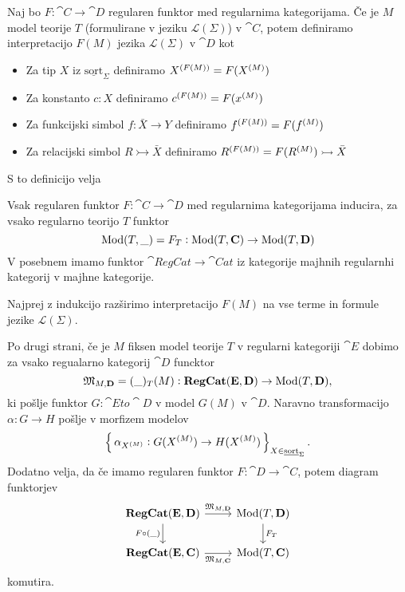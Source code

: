 \documentclass[../kategoricna_logika.tex]{subfiles}
\begin{document}
\begin{definicija}
  Naj bo $F : \cat{C} \to \cat{D}$ regularen funktor med regularnima kategorijama.
  Če je $M$ model teorije $T$ (formulirane v jeziku $\mathcal{L}(\Sigma)$) v $\cat{C}$,
  potem definiramo interpretacijo $F(M)$ jezika $\mathcal{L}(\Sigma)$ v $\cat{D}$ kot
  \begin{itemize}
    \item Za tip $X$ iz $\underline{\mathrm{sort}}_\Sigma$ definiramo $\interp[F(M)]{X} = F(\interp{X})$
    \item Za konstanto $c:X$ definiramo $\interp[F(M)]{c} = F(\interp{x})$
    \item Za funkcijski simbol $f : \bar{X} \to Y$ definiramo $\interp[F(M)]{f} = F(\interp{f})$
    \item Za relacijski simbol $R \rightarrowtail \bar{X}$ definiramo $\interp[F(M)]{R} = F(\interp{R}) \rightarrowtail \bar{X}$
  \end{itemize}
\end{definicija}
S to definicijo velja
\begin{lema}
  Vsak regularen funktor $F : \cat{C} \to \cat{D}$ med regularnima kategorijama inducira,
  za vsako regularno teorijo $T$ funktor
  $$\Mod(T, \_)=F_T : \Mod(T,\cat{C}) \to \Mod(T, \cat{D})$$
  V posebnem imamo funktor $\cat{RegCat} \to \cat{Cat}$ iz kategorije majhnih regularnhi kategorij v majhne kategorije.
\end{lema}
\begin{dokaz}
  Najprej z indukcijo razširimo interpretacijo $F(M)$ na vse terme in formule jezike $\mathcal{L}(\Sigma)$.
\end{dokaz}
Po drugi strani, če je $M$ fiksen model teorije $T$ v regularni kategoriji $\cat{E}$
dobimo za vsako regualarno kategorij $\cat{D}$ funcktor
$$\mathfrak{M}_{M,\cat{D}} = (\_)_T(M): \cat{RegCat}(\cat{E}, \cat{D}) \to \Mod(T, \cat{D}),$$
ki pošlje funktor $G : \cat{E} to \cat{D}$ v model $G(M)$ v $\cat{D}$.
Naravno transformacijo $\alpha : G \to H$ pošlje v morfizem modelov
$$\set{\alpha_{\interp{X}}: G(\interp{X}) \to H(\interp{X})}_{X \in \underline{\mathrm{sort}}_{\Sigma}}.$$
Dodatno velja, da če imamo regularen funktor $F : \cat{D} \to \cat{C}$, potem diagram funktorjev
\begin{equation}
  \begin{tikzcd}
    \cat{RegCat}(\cat{E}, \cat{D}) \ar[d, "F \circ (\_)"'] \ar[r, "\mathfrak{M}_{M,\cat{D}}"] & \Mod(T, \cat{D}) \ar[d, "F_T"] \\
    \cat{RegCat}(\cat{E}, \cat{C}) \ar[r, "\mathfrak{M}_{M,\cat{C}}"'] & \Mod(T, \cat{C})
  \end{tikzcd}
\end{equation}
komutira.
\end{document}
